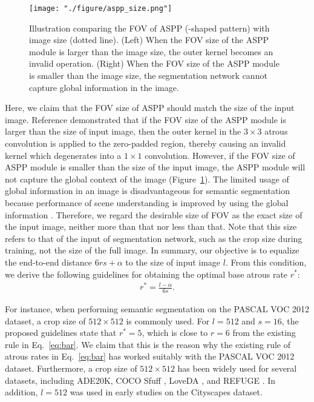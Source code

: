 \documentclass{article}
\def\figref#1{Figure~\ref{#1}}
\def\eqref#1{Eq.~\ref{#1}}
\begin{document}
\begin{figure}[t!]
	\centering
	\texttt{[image: "./figure/aspp\_size.png"]}
	\caption{Illustration comparing the FOV of ASPP (\EightStarTaper-shaped pattern) with image size (dotted line). (Left) When the FOV size of the ASPP module is larger than the image size, the outer kernel becomes an invalid operation. (Right) When the FOV size of the ASPP module is smaller than the image size, the segmentation network cannot capture global information in the image.}
	\label{fig:asppsize}
\end{figure}

Here, we claim that the FOV size of ASPP should match the size of the input image. Reference \citep{DBLP:journals/corr/ChenPSA17} demonstrated that if the FOV size of the ASPP module is larger than the size of input image, then the outer kernel in the $3 \times 3$ atrous convolution is applied to the zero-padded region, thereby causing an invalid kernel which degenerates into a $1 \times 1$ convolution. However, if the FOV size of ASPP module is smaller than the size of the input image, the ASPP module will not capture the global context of the image (\figref{fig:asppsize}). The limited usage of global information in an image is disadvantageous for semantic segmentation because performance of scene understanding is improved by using the global information \citep{DBLP:conf/cvpr/YangYZLY18}. Therefore, we regard the desirable size of FOV as the exact size of the input image, neither more than that nor less than that. Note that this size refers to that of the input of segmentation network, such as the crop size during training, not the size of the full image. In summary, our objective is to equalize the end-to-end distance $6rs+\alpha$ to the size of input image $l$. From this condition, we derive the following guidelines for obtaining the optimal base atrous rate $r^*$:
\begin{align}
	r^* = \frac{l-\alpha}{6s}. \label{eq:guide}
\end{align}

For instance, when performing semantic segmentation on the PASCAL VOC 2012 dataset, a crop size of $512 \times 512$ is commonly used. For $l=512$ and $s=16$, the proposed guidelines state that $r^*=5$, which is close to $r=6$ from the existing rule in \eqref{eq:bar}. We claim that this is the reason why the existing rule of atrous rates in \eqref{eq:bar} has worked suitably with the PASCAL VOC 2012 dataset. Furthermore, a crop size of $512 \times 512$ has been widely used for several datasets, including ADE20K, COCO Sfuff \citep{DBLP:conf/cvpr/CaesarUF18}, LoveDA \citep{DBLP:conf/nips/WangZMLZ21}, and REFUGE \citep{DBLP:journals/mia/OrlandoFBKBDFHK20}. In addition, $l=512$ was used in early studies on the Cityscapes dataset.
\end{document}
